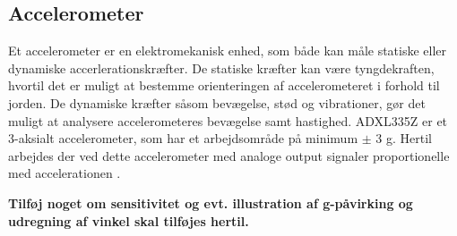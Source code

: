 


\subsection{Accelerometer}
Et accelerometer er en elektromekanisk enhed, som både kan måle statiske eller dynamiske accerlerationskræfter. De statiske kræfter kan være tyngdekraften, hvortil det er muligt at bestemme orienteringen af accelerometeret i forhold til jorden. De dynamiske kræfter såsom bevægelse, stød og vibrationer, gør det muligt at analysere accelerometeres bevægelse samt hastighed. 
ADXL335Z er et 3-aksialt accelerometer, som har et arbejdsområde på minimum $\pm$ 3 g. Hertil arbejdes der ved dette accelerometer med analoge output signaler proportionelle med accelerationen \citep{analogdevices2010}. 

\textbf{Tilføj noget om sensitivitet og evt. illustration af g-påvirking og udregning af vinkel skal tilføjes hertil.}






